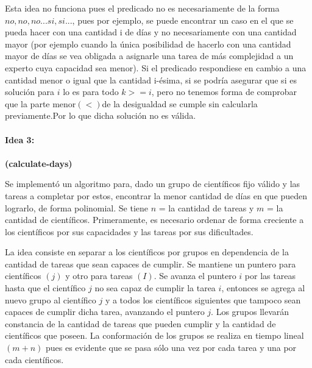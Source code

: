 \documentclass[10pt,letterpaper]{article}
\begin{document}
{ 	Esta idea no funciona pues el predicado no es necesariamente de la forma $no,no,no...si,si...$, pues por ejemplo, se puede encontrar un caso en el que se pueda hacer con una cantidad i de d\'ias y no necesariamente con una cantidad mayor (por ejemplo cuando la \'unica posibilidad de hacerlo con una cantidad mayor de d\'ias se vea obligada a asignarle una tarea de m\'as complejidad a un experto cuya capacidad sea menor). Si el predicado respondiese en cambio a una cantidad menor o igual que la cantidad i-\'esima, si se podr\'ia asegurar que si es soluci\'on para $i$ lo es para todo $k >= i$, pero no tenemos forma de comprobar que la parte menor$(<) $de la desigualdad se cumple sin calcularla previamente.Por lo que dicha soluci\'on no es v\'alida.\\ \\
 	
 	
 	{\Large \bf Idea 3:}\\ \\
 	{\small \bf (calculate-days)}
 	
 	Se implement\'o un algoritmo para, dado un grupo de cient\'ificos fijo v\'alido y las tareas a completar por estos, encontrar la menor cantidad de d\'ias en que pueden lograrlo, de forma polinomial. Se tiene $n$ = la cantidad de tareas y $m$ = la cantidad de cient\'ificos. Primeramente, es necesario ordenar de forma creciente a los cient\'ificos por sus capacidades y las tareas por sus dificultades.
 	
 	La idea consiste en separar a los cient\'ificos por grupos en dependencia de la cantidad de tareas que sean capaces de cumplir. Se mantiene un puntero para cient\'ificos $(j)$ y otro para tareas $(I)$. Se avanza el puntero $i$ por las tareas hasta que el cient\'ifico $j$ no sea capaz de cumplir la tarea $i$, entonces se agrega al nuevo grupo al cient\'ifico $j$ y a todos los cient\'ificos siguientes que tampoco sean capaces de cumplir dicha tarea, avanzando el puntero $j$. Los grupos llevar\'an constancia de la cantidad de tareas que pueden cumplir y la cantidad de cient\'ificos que poseen. La conformaci\'on de los grupos se realiza en tiempo lineal $(m + n)$ pues es evidente que se pasa s\'olo una vez por cada tarea y una por cada cient\'ificos.
 	
}
\end{document}
